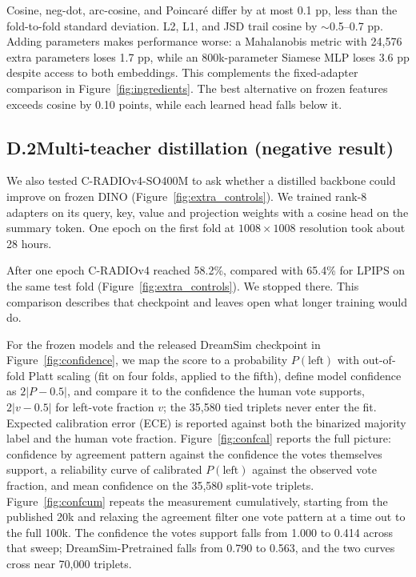 Cosine, neg-dot, arc-cosine, and Poincar\'e differ by at most 0.1 pp, less than the fold-to-fold standard deviation. L2, L1, and JSD trail cosine by $\sim$0.5--0.7 pp. Adding parameters makes performance worse: a Mahalanobis metric with 24{,}576 extra parameters loses 1.7 pp, while an 800k-parameter Siamese MLP loses 3.6 pp despite access to both embeddings. This complements the fixed-adapter comparison in Figure~\ref{fig:ingredients}. The best alternative on frozen features exceeds cosine by 0.10 points, while each learned head falls below it.

\subsection*{D.2\quad Multi-teacher distillation (negative result)}

We also tested C-RADIOv4-SO400M to ask whether a distilled backbone could improve on frozen DINO (Figure~\ref{fig:extra_controls}). We trained rank-8 adapters on its query, key, value and projection weights with a cosine head on the summary token. One epoch on the first fold at $1008\times1008$ resolution took about 28 hours.

After one epoch C-RADIOv4 reached 58.2\%, compared with 65.4\% for LPIPS on the same test fold (Figure~\ref{fig:extra_controls}). We stopped there. This comparison describes that checkpoint and leaves open what longer training would do.

\clearpage
{}
\vspace{1em}

For the frozen models and the released DreamSim checkpoint in Figure~\ref{fig:confidence}, we map the score to a probability $P(\text{left})$ with out-of-fold Platt scaling (fit on four folds, applied to the fifth), define model confidence as $2|P-0.5|$, and compare it to the confidence the human vote supports, $2|v-0.5|$ for left-vote fraction $v$; the 35{,}580 tied triplets never enter the fit. Expected calibration error (ECE) is reported against both the binarized majority label and the human vote fraction. Figure~\ref{fig:confcal} reports the full picture: confidence by agreement pattern against the confidence the votes themselves support, a reliability curve of calibrated $P(\text{left})$ against the observed vote fraction, and mean confidence on the 35{,}580 split-vote triplets. Figure~\ref{fig:confcum} repeats the measurement cumulatively, starting from the published 20k and relaxing the agreement filter one vote pattern at a time out to the full 100k. The confidence the votes support falls from 1.000 to 0.414 across that sweep; DreamSim-Pretrained falls from 0.790 to 0.563, and the two curves cross near 70{,}000 triplets.

